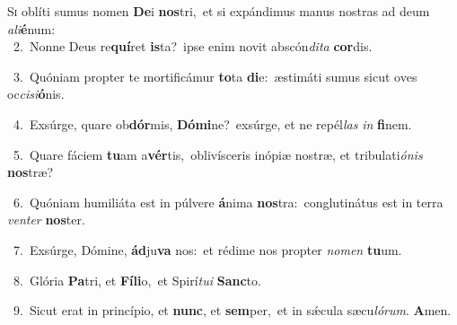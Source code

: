 \lettrine{\initial\textcolor{\initialcolor}{S}}{i} oblíti sumus nomen \textbf{De}\-i \textbf{nos}\-tri,~\star et si expándimus manus nostras ad deum \textit{a}\-\textit{li}\textbf{é}num:\\
{\numbfont\textcolor{\numbcolor}{~2.}}~Nonne Deus re\-\textbf{quí}\-ret \textbf{is}\-ta?~\star ipse enim novit abscón\-\textit{di}\-\textit{ta} \textbf{cor}\-dis.\par
{\numbfont\textcolor{\numbcolor}{~3.}}~Quóniam propter te mortificámur \textbf{to}\-ta \textbf{di}\-e:~\star æstimáti sumus sicut oves oc\-\textit{ci}\-\textit{si}\textbf{ó}nis.\par
{\numbfont\textcolor{\numbcolor}{~4.}}~Exsúrge, quare ob\-\textbf{dór}\-mis, \textbf{Dó}\-\textbf{mi}ne?~\star exsúrge, et ne repél\textit{las} \textit{in} \textbf{fi}\-nem.\par
{\numbfont\textcolor{\numbcolor}{~5.}}~Quare fáciem \textbf{tu}\-am a\-\textbf{vér}\-tis,~\star oblivísceris inópiæ nostræ, et tribulati\-\textit{ó}\-\textit{nis} \textbf{nos}\-træ?\par
{\numbfont\textcolor{\numbcolor}{~6.}}~Quóniam humiliáta est in púlvere \textbf{á}\-nima \textbf{nos}\-tra:~\star conglutinátus est in terra \textit{ven}\-\textit{ter} \textbf{nos}\-ter.\par
{\numbfont\textcolor{\numbcolor}{~7.}}~Exsúrge, Dómine, \textbf{ád}\-ju\textbf{va} nos:~\star et rédime nos propter \textit{no}\-\textit{men} \textbf{tu}\-um.\par
{\numbfont\textcolor{\numbcolor}{~8.}}~Glória \textbf{Pa}\-tri, et \textbf{Fí}\-\textbf{li}o,~\star et Spirí\-\textit{tu}\-\textit{i} \textbf{Sanc}\-to.\par
{\numbfont\textcolor{\numbcolor}{~9.}}~Sicut erat in princípio, et \textbf{nunc}\-, et \textbf{sem}\-per,~\star et in sǽcula sæcu\-\textit{ló}\-\textit{rum}. \textbf{A}\-men.\par
